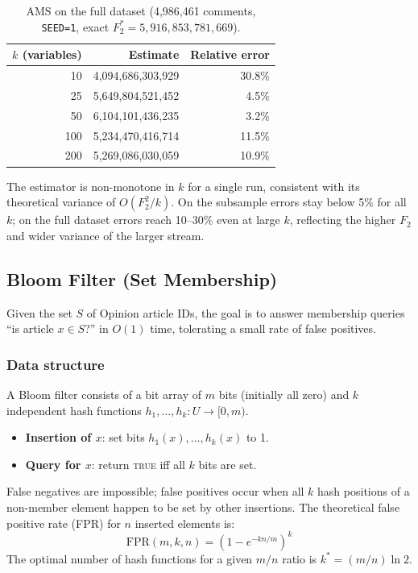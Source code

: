 \documentclass[11pt,a4paper]{article}
\begin{document}
\begin{table}[H]
\centering
\begin{tabular}{rrr}
\toprule
$k$ (variables) & Estimate & Relative error \\
\midrule
 10 & 4,094,686,303,929 & 30.8\% \\
 25 & 5,649,804,521,452 &  4.5\% \\
 50 & 6,104,101,436,235 &  3.2\% \\
100 & 5,234,470,416,714 & 11.5\% \\
200 & 5,269,086,030,059 & 10.9\% \\
\bottomrule
\end{tabular}
\caption{AMS on the full dataset (4,986,461 comments, \texttt{SEED=1}, exact $F_2^* = 5{,}916{,}853{,}781{,}669$).}
\label{tab:ams}
\end{table}

The estimator is non-monotone in $k$ for a single run, consistent with its
theoretical variance of $O(F_2^2/k)$.
On the subsample errors stay below 5\% for all $k$; on the full dataset errors
reach 10--30\% even at large $k$, reflecting the higher $F_2$ and wider variance
of the larger stream.

\subsection{Bloom Filter (Set Membership)}

Given the set $S$ of Opinion article IDs, the goal is to answer membership queries
``is article $x \in S$?'' in $O(1)$ time, tolerating a small rate of false positives.

\subsubsection*{Data structure}
A Bloom filter consists of a bit array of $m$ bits (initially all zero) and $k$
independent hash functions $h_1, \ldots, h_k : U \to [0, m)$.
\begin{itemize}
  \item \textbf{Insertion of $x$}: set bits $h_1(x), \ldots, h_k(x)$ to 1.
  \item \textbf{Query for $x$}: return \textsc{true} iff all $k$ bits are set.
\end{itemize}
False negatives are impossible; false positives occur when all $k$ hash positions of
a non-member element happen to be set by other insertions.
The theoretical false positive rate (FPR) for $n$ inserted elements is:
\[
  \mathrm{FPR}(m,k,n) = \left(1 - e^{-kn/m}\right)^k
\]
The optimal number of hash functions for a given $m/n$ ratio is
$k^* = (m/n)\ln 2$.
\end{document}
